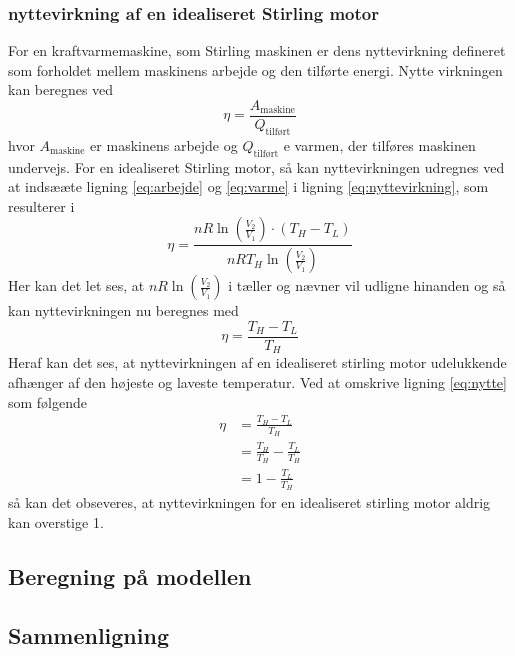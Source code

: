\documentclass[SRC.tex]{subfiles}
\begin{document}
	\subsubsection{nyttevirkning af en idealiseret Stirling motor}
	For en kraftvarmemaskine, som Stirling maskinen er dens nyttevirkning defineret som forholdet mellem maskinens arbejde og den tilførte energi. Nytte virkningen kan beregnes ved 
	\begin{equation}
		\eta = \frac{A_{\text{maskine}}}{Q_{\text{tilført}}}
		\label{eq:nyttevirkning}
	\end{equation}
	hvor \(A_{\text{maskine}}\) er maskinens arbejde og \(Q_{\text{tilført}}\) e varmen, der tilføres maskinen undervejs. For en idealiseret Stirling motor, så kan nyttevirkningen udregnes ved at indsææte ligning \eqref{eq:arbejde} og \eqref{eq:varme} i ligning \eqref{eq:nyttevirkning}, som resulterer i
	\begin{equation}
		\eta = \frac{nR\ln\left(\frac{V_2}{V_1}\right)\cdot (T_H - T_L)}{nRT_H\ln\left(\frac{V_2}{V_1}\right)} 
	\end{equation}
	Her kan det let ses, at \(nR\ln\left(\frac{V_2}{V_1}\right)\) i tæller og nævner vil udligne hinanden og så kan nyttevirkningen nu beregnes med
	\begin{equation}
		\eta = \frac{T_H-T_L}{T_H}
		\label{eq:nytte}
	\end{equation}
	Heraf kan det ses, at nyttevirkningen af en idealiseret stirling motor udelukkende afhænger af den højeste og laveste temperatur. Ved at omskrive ligning \eqref{eq:nytte} som følgende
	\begin{subequations}
		\begin{align}
			\eta &= \frac{T_H-T_L}{T_H} \\
			 	 &= \frac{T_H}{T_H}-\frac{T_L}{T_H} \\
			 	 &= 1 -\frac{T_L}{T_H}
		\end{align}
	\end{subequations}
	så kan det obseveres, at nyttevirkningen for en idealiseret stirling motor aldrig kan overstige 1. 
	\subsection{Beregning på modellen}
	\subsection{Sammenligning}
\end{document}
